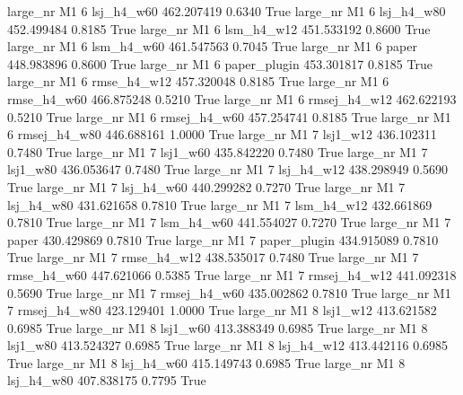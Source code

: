   large_nr       M1                 6   lsj_h4_w60  462.207419      0.6340    True
  large_nr       M1                 6   lsj_h4_w80  452.499484      0.8185    True
  large_nr       M1                 6   lsm_h4_w12  451.533192      0.8600    True
  large_nr       M1                 6   lsm_h4_w60  461.547563      0.7045    True
  large_nr       M1                 6        paper  448.983896      0.8600    True
  large_nr       M1                 6 paper_plugin  453.301817      0.8185    True
  large_nr       M1                 6  rmse_h4_w12  457.320048      0.8185    True
  large_nr       M1                 6  rmse_h4_w60  466.875248      0.5210    True
  large_nr       M1                 6 rmsej_h4_w12  462.622193      0.5210    True
  large_nr       M1                 6 rmsej_h4_w60  457.254741      0.8185    True
  large_nr       M1                 6 rmsej_h4_w80  446.688161      1.0000    True
  large_nr       M1                 7     lsj1_w12  436.102311      0.7480    True
  large_nr       M1                 7     lsj1_w60  435.842220      0.7480    True
  large_nr       M1                 7     lsj1_w80  436.053647      0.7480    True
  large_nr       M1                 7   lsj_h4_w12  438.298949      0.5690    True
  large_nr       M1                 7   lsj_h4_w60  440.299282      0.7270    True
  large_nr       M1                 7   lsj_h4_w80  431.621658      0.7810    True
  large_nr       M1                 7   lsm_h4_w12  432.661869      0.7810    True
  large_nr       M1                 7   lsm_h4_w60  441.554027      0.7270    True
  large_nr       M1                 7        paper  430.429869      0.7810    True
  large_nr       M1                 7 paper_plugin  434.915089      0.7810    True
  large_nr       M1                 7  rmse_h4_w12  438.535017      0.7480    True
  large_nr       M1                 7  rmse_h4_w60  447.621066      0.5385    True
  large_nr       M1                 7 rmsej_h4_w12  441.092318      0.5690    True
  large_nr       M1                 7 rmsej_h4_w60  435.002862      0.7810    True
  large_nr       M1                 7 rmsej_h4_w80  423.129401      1.0000    True
  large_nr       M1                 8     lsj1_w12  413.621582      0.6985    True
  large_nr       M1                 8     lsj1_w60  413.388349      0.6985    True
  large_nr       M1                 8     lsj1_w80  413.524327      0.6985    True
  large_nr       M1                 8   lsj_h4_w12  413.442116      0.6985    True
  large_nr       M1                 8   lsj_h4_w60  415.149743      0.6985    True
  large_nr       M1                 8   lsj_h4_w80  407.838175      0.7795    True
